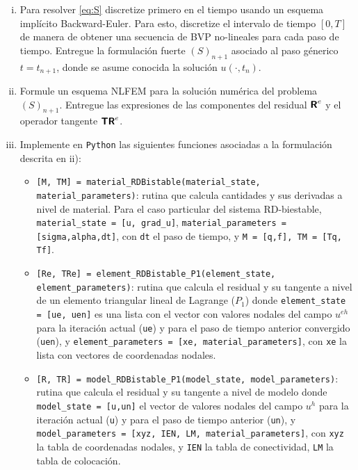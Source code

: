 \documentclass[11pt,letterpaper]{article}
\def\mat   #1{\mbox{\boldmath $\mathsf #1$}}
\begin{document}
\begin{enumerate}[i)]

\item Para resolver \eqref{eq:S} discretize primero en el tiempo usando un esquema impl\'icito Backward-Euler. Para esto, discretize el intervalo de tiempo $[0,T]$ de manera de obtener una secuencia de BVP no-lineales para cada paso de tiempo. Entregue la formulaci\'on fuerte $(S)_{n+1}$ asociado al paso g\'enerico $t=t_{n+1}$, donde se asume conocida la soluci\'on $u(\cdot, t_{n})$.

\item Formule un esquema NLFEM para la soluci\'on num\'erica del problema $(S)_{n+1}$. Entregue las expresiones de las componentes del residual $\mat R^e$ y el operador tangente $\mat T\mat R^e$.

\item Implemente en {\tt Python} las siguientes funciones asociadas a la formulaci\'on descrita en ii):
	\begin{itemize}
		\item {\tt [M, TM] = material\_RDBistable(material\_state, material\_parameters)}: rutina que calcula cantidades y sus derivadas a nivel de material. Para el caso particular del sistema RD-biestable, {\tt material\_state = [u, grad\_u]}, {\tt material\_parameters = [sigma,alpha,dt]}, con {\tt dt} el paso de tiempo, y {\tt M = [q,f], TM = [Tq, Tf]}.
		
		\item {\tt [Re, TRe] = element\_RDBistable\_P1(element\_state, element\_parameters)}: rutina que calcula el residual y su tangente a nivel de un elemento triangular lineal de Lagrange ($P_1$) donde {\tt element\_state = [ue, uen]} es una lista con el vector con valores nodales del campo $u^{eh}$ para la iteraci\'on actual ({\tt ue}) y para el paso de tiempo anterior convergido ({\tt uen}), y {\tt element\_parameters = [xe, material\_parameters]}, con {\tt xe} la lista con vectores de coordenadas nodales. 
		\item {\tt [R, TR] = model\_RDBistable\_P1(model\_state, model\_parameters)}: rutina que calcula el residual y su tangente a nivel de modelo donde {\tt model\_state = [u,un]} el vector de valores nodales del campo $u^h$ para la iteraci\'on actual ({\tt u}) y para el paso de tiempo anterior ({\tt un}), y {\tt model\_parameters = [xyz, IEN, LM, material\_parameters]}, con {\tt xyz} la tabla de coordenadas nodales, y {\tt IEN} la tabla de conectividad, {\tt LM} la tabla de colocaci\'on.
	\end{itemize}



\end{enumerate}
\end{document}
